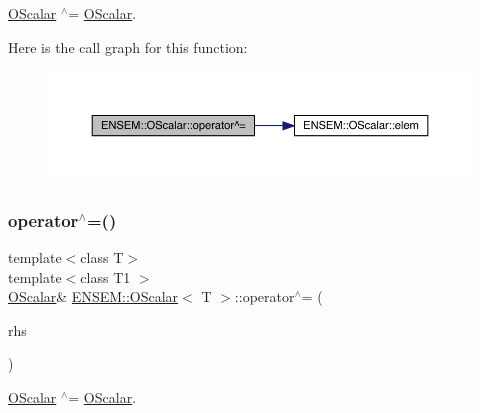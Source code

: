 \mbox{\hyperlink{classENSEM_1_1OScalar}{O\+Scalar}} $^\wedge$= \mbox{\hyperlink{classENSEM_1_1OScalar}{O\+Scalar}}. 

Here is the call graph for this function\+:
\nopagebreak
\begin{figure}[H]
\begin{center}
\leavevmode
\includegraphics[width=350pt]{da/d80/classENSEM_1_1OScalar_af66decef8e6be220193ad1292a927e2f_cgraph}
\end{center}
\end{figure}
\mbox{\label{classENSEM_1_1OScalar_af66decef8e6be220193ad1292a927e2f}} 
\subsubsection{\texorpdfstring{operator$^\wedge$=()}{operator^=()}\hspace{0.1cm}{\footnotesize\ttfamily [2/2]}}
{\footnotesize\ttfamily template$<$class T$>$ \\
template$<$class T1 $>$ \\
\mbox{\hyperlink{classENSEM_1_1OScalar}{O\+Scalar}}\& \mbox{\hyperlink{classENSEM_1_1OScalar}{E\+N\+S\+E\+M\+::\+O\+Scalar}}$<$ T $>$\+::operator$^\wedge$= (\begin{DoxyParamCaption}\item[{const \mbox{\hyperlink{classENSEM_1_1OScalar}{O\+Scalar}}$<$ T1 $>$ \&}]{rhs }\end{DoxyParamCaption})\hspace{0.3cm}{\ttfamily [inline]}}



\mbox{\hyperlink{classENSEM_1_1OScalar}{O\+Scalar}} $^\wedge$= \mbox{\hyperlink{classENSEM_1_1OScalar}{O\+Scalar}}. 

